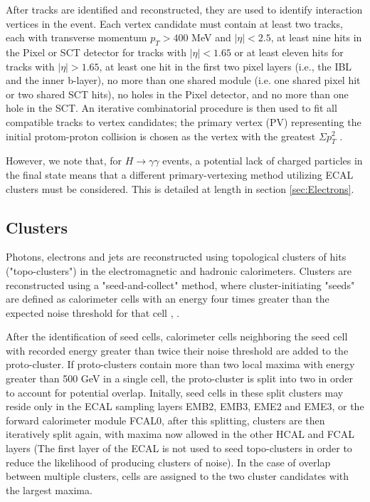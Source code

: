 After tracks are identified and reconstructed, they are used to identify interaction vertices in the event. Each vertex candidate must contain at least two tracks, each with transverse momentum $p_{T} > 400$ MeV and $|\eta|<2.5$, at least nine hits in the Pixel or SCT detector for tracks with $|\eta|<1.65$ or at least eleven hits for tracks with $|\eta|>1.65$, at least one hit in the first two pixel layers (i.e., the IBL and the inner b-layer), no more than one shared module (i.e. one shared pixel hit or two shared SCT hits), no holes in the Pixel detector, and no more than one hole in the SCT. An iterative combinatorial procedure is then used to fit all compatible tracks to vertex candidates; the primary vertex (PV) representing the initial protom-proton collision is chosen as the vertex with the greatest $\Sigma p_{T}^{2}$ \cite{VertexMeloni}.

However, we note that, for $H \rightarrow \gamma \gamma$ events, a potential lack of charged particles in the final state means that a different primary-vertexing method utilizing ECAL clusters must be considered. This is detailed at length in section \ref{sec:Electrons}.


\subsection{Clusters} \label{sec:Clusters} 

Photons, electrons and jets are reconstructed using topological clusters of hits ("topo-clusters") in the electromagnetic and hadronic calorimeters. Clusters are reconstructed using a "seed-and-collect" method, where cluster-initiating "seeds" are defined as calorimeter cells with an energy four times greater than the expected noise threshold for that cell  \cite{CERN-EP-2019-145}, \cite{ECALdiagram}.

After the identification of seed cells, calorimeter cells neighboring the seed cell with recorded energy greater than twice their noise threshold are added to the proto-cluster. If proto-clusters contain more than two local maxima with energy greater than 500 GeV in a single cell, the proto-cluster is split into two in order to account for potential overlap. Initally, seed cells in these split clusters may reside only in the ECAL sampling layers EMB2, EMB3, EME2 and EME3, or the forward calorimeter module FCAL0, after this splitting, clusters are then iteratively split again, with maxima now allowed in the other HCAL and FCAL layers (The first layer of the ECAL is not used to seed topo-clusters in order to reduce the likelihood of producing clusters of noise). In the case of overlap between multiple clusters, cells are assigned to the two cluster candidates with the largest maxima.

